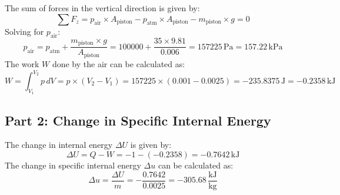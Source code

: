 \documentclass{article}
\begin{document}
The sum of forces in the vertical direction is given by:
\[
\sum F_z = p_{\text{air}} \times A_{\text{piston}} - p_{\text{atm}} \times A_{\text{piston}} - m_{\text{piston}} \times g = 0
\]
Solving for \(p_{\text{air}}\):
\[
p_{\text{air}} = p_{\text{atm}} + \frac{m_{\text{piston}} \times g}{A_{\text{piston}}} = 100000 + \frac{35 \times 9.81}{0.006} = 157225 \, \text{Pa} = 157.22 \, \text{kPa}
\]
The work \(W\) done by the air can be calculated as:
\[
W = \int_{V_1}^{V_2}{p \, dV} = p \times (V_2 - V_1) = 157225 \times (0.001 - 0.0025) = -235.8375 \, \text{J} = -\mathbf{0.2358} \, \text{kJ}
\]

\subsection*{Part 2: Change in Specific Internal Energy}

The change in internal energy \( \Delta U \) is given by:
\[
\Delta U = Q - W = -1 - (-0.2358) = -0.7642 \, \text{kJ}
\]
The change in specific internal energy \( \Delta u \) can be calculated as:
\[
\Delta u = \frac{\Delta U}{m} = -\frac{0.7642}{0.0025} = -\mathbf{305.68} \, \frac{\text{kJ}}{\text{kg}}
\]
\end{document}
